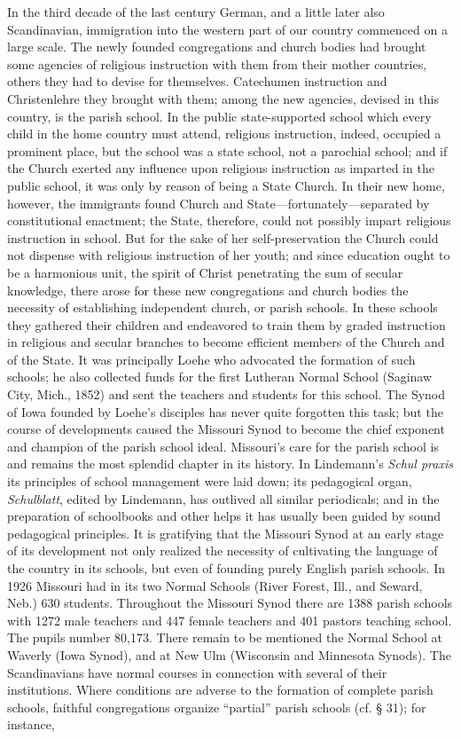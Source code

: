 In the third decade of the last century German, and a little later also Scandinavian, immigration into the western part of our country commenced on a large scale. The newly founded congregations and church bodies had brought some agencies of religious instruction with them from their mother countries, others they had to devise for themselves. Catechumen instruction and Christenlehre they brought with them; among the new agencies, devised in this country, is the parish school. In the public state-supported school which every child in the home country must attend, religious instruction, indeed, occupied a prominent place, but the school was a state school, not a parochial school; and if the Church exerted any influence upon religious instruction as imparted in the public school, it was only by reason of being a State Church. In their new home, however, the immigrants found Church and State—fortunately—separated by constitutional enactment; the State, therefore, could not possibly impart religious instruction in school. But for the sake of her self-preservation the Church could not dispense with religious instruction of her youth; and since education ought to be a harmonious
unit, the spirit of Christ penetrating the sum of secular knowledge, there arose for these new congregations and church bodies the necessity of establishing independent church, or parish schools. In these schools they gathered their children and endeavored to train them by graded instruction in religious and secular branches to become efficient members of the Church and of the State. It was principally Loehe who advocated the formation of such schools; he also collected funds for the first Lutheran Normal School (Saginaw City, Mich., 1852) and sent the teachers and students for this school. The Synod of Iowa founded by Loehe’s disciples has never quite forgotten this task; but the course of developments caused the Missouri Synod to become the chief exponent and champion of the parish school ideal. Missouri’s care for the parish school is and remains the most splendid chapter in its history. In Lindemann’s \emph{Schul praxis} its principles of school management were laid down; its pedagogical organ, \emph{Schulblatt}, edited by Lindemann, has outlived all similar periodicals; and in the preparation of schoolbooks and other helps it has usually been guided by sound pedagogical principles. It is gratifying that the Missouri Synod at an early stage of its development not only realized the necessity of cultivating the language of the country in its schools, but even of founding purely English parish schools. In 1926 Missouri had in its two Normal Schools (River Forest, Ill., and Seward, Neb.) 630 students. Throughout the Missouri Synod there are 1388 parish schools with 1272 male teachers and 447 female teachers and 401 pastors teaching school. The pupils number 80,173. There remain to be mentioned the Normal School at Waverly (Iowa Synod), and at New Ulm (Wisconsin and Minnesota Synods). The Scandinavians have normal courses in connection with several of their institutions. Where conditions are adverse to the formation of complete parish schools, faithful congregations organize “partial” parish schools (cf. § 31); for instance,

